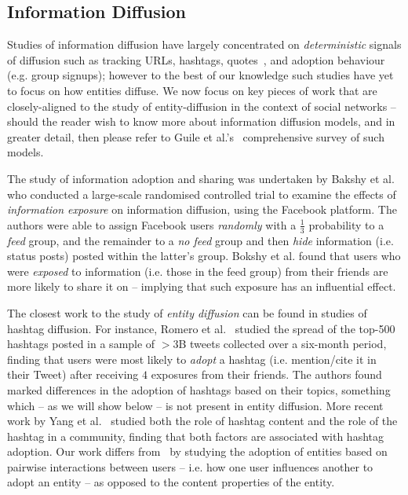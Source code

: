 \documentclass[sigconf]{acmart}
\begin{document}
\subsection{Information Diffusion}
Studies of information diffusion have largely concentrated on \emph{deterministic} signals of diffusion such as tracking URLs, hashtags, quotes~\cite{suen2013nifty}, and adoption behaviour (e.g. group signups); however to the best of our knowledge such studies have yet to focus on how entities diffuse.
We now focus on key pieces of work that are closely-aligned to the study of entity-diffusion in the context of social networks -- should the reader wish to know more about information diffusion models, and in greater detail, then please refer to Guile et al.'s~\cite{guille2013information} comprehensive survey of such models.

The study of information adoption and sharing was undertaken by Bakshy et al.~\cite{bakshy2012role} who conducted a large-scale randomised controlled trial to examine the effects of \emph{information exposure} on information diffusion, using the Facebook platform.
The authors were able to assign Facebook users \emph{randomly} with a $\frac{1}{3}$ probability to a \emph{feed} group, and the remainder to a \emph{no feed} group and then \emph{hide} information (i.e. status posts) posted within the latter's group.
Bokshy et al. found that users who were \emph{exposed} to information (i.e. those in the feed group) from their friends are more likely to share it on -- implying that such exposure has an influential effect.

The closest work to the study of \emph{entity diffusion} can be found in studies of hashtag diffusion.
For instance, Romero et al.~\cite{romero2011differences} studied the spread of the top-500 hashtags posted in a sample of $>3$B tweets collected over a six-month period, finding that users were most likely to \emph{adopt} a hashtag (i.e. mention/cite it in their Tweet) after receiving $4$ exposures from their friends.
The authors found marked differences in the adoption of hashtags based on their topics, something which -- as we will show below -- is not present in entity diffusion.
More recent work by Yang et al.~\cite{yang2012we} studied both the role of hashtag content and the role of the hashtag in a community, finding that both factors are associated with hashtag adoption.
Our work differs from~\cite{yang2012we} by studying the adoption of entities based on pairwise interactions between users -- i.e. how one user influences another to adopt an entity -- as opposed to the content properties of the entity.
\end{document}

